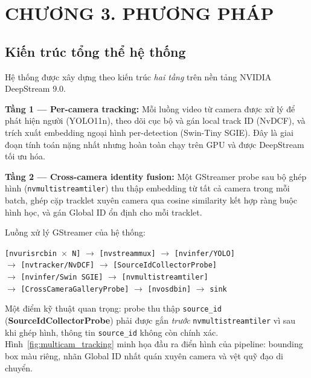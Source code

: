 \documentclass{article} %
\begin{document}
\newpage

\section*{CHƯƠNG 3.  PHƯƠNG PHÁP}
\setcounter{section}{3}
\setcounter{subsection}{0}
\setcounter{figure}{0}
\setcounter{table}{0}

\subsection{Kiến trúc tổng thể hệ thống}

Hệ thống được xây dựng theo kiến trúc \textit{hai tầng} trên nền tảng NVIDIA DeepStream 9.0.

\textbf{Tầng 1 --- Per-camera tracking:} Mỗi luồng video từ camera được xử lý để phát hiện người (YOLO11n), theo dõi cục bộ và gán local track ID (NvDCF), và trích xuất embedding ngoại hình per-detection (Swin-Tiny SGIE). Đây là giai đoạn tính toán nặng nhất nhưng hoàn toàn chạy trên GPU và được DeepStream tối ưu hóa.

\textbf{Tầng 2 --- Cross-camera identity fusion:} Một GStreamer probe sau bộ ghép hình (\texttt{nvmultistreamtiler}) thu thập embedding từ tất cả camera trong mỗi batch, ghép cặp tracklet xuyên camera qua cosine similarity kết hợp ràng buộc hình học, và gán Global ID ổn định cho mỗi tracklet.

Luồng xử lý GStreamer của hệ thống:

\begin{center}
\texttt{[nvurisrcbin $\times$ N]} $\to$ \texttt{[nvstreammux]} $\to$ \texttt{[nvinfer/YOLO]}\\
$\to$ \texttt{[nvtracker/NvDCF]} $\to$ \texttt{[SourceIdCollectorProbe]}\\
$\to$ \texttt{[nvinfer/Swin SGIE]} $\to$ \texttt{[nvmultistreamtiler]}\\
$\to$ \texttt{[CrossCameraGalleryProbe]} $\to$ \texttt{[nvosdbin]} $\to$ \texttt{sink}
\end{center}

Một điểm kỹ thuật quan trọng: probe thu thập \texttt{source\_id} (\textbf{SourceIdCollectorProbe}) phải được gắn \textit{trước} \texttt{nvmultistreamtiler} vì sau khi ghép hình, thông tin \texttt{source\_id} không còn chính xác. Hình~\ref{fig:multicam_tracking} minh họa đầu ra điển hình của pipeline: bounding box màu riêng, nhãn Global ID nhất quán xuyên camera và vệt quỹ đạo di chuyển.
\end{document}
